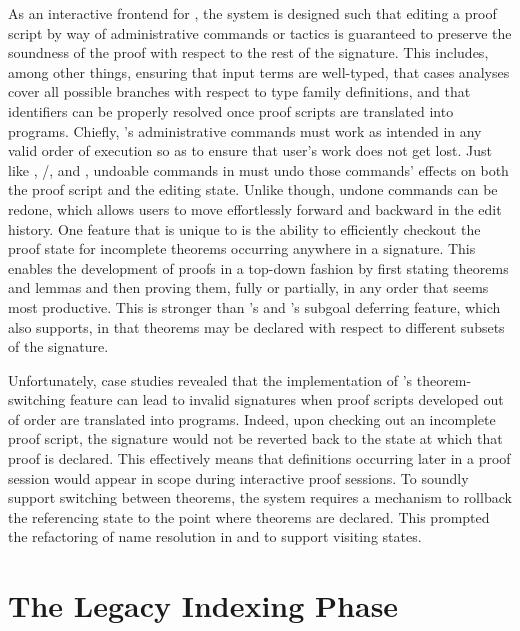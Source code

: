 As an interactive frontend for \Beluga, the \Harpoon system is designed such that editing a proof script by way of administrative commands or tactics is guaranteed to preserve the soundness of the proof with respect to the rest of the \Beluga signature.
This includes, among other things, ensuring that input terms are well-typed, that cases analyses cover all possible branches with respect to type family definitions, and that identifiers can be properly resolved once proof scripts are translated into programs.
Chiefly, \Harpoon's administrative commands must work as intended in any valid order of execution so as to ensure that user's work does not get lost.
Just like \Abella, \Isabelle/\Isar, \Coq and \Agda, undoable commands in \Harpoon must undo those commands' effects on both the proof script and the editing state.
Unlike \Abella though, undone commands can be redone, which allows users to move effortlessly forward and backward in the edit history.
One feature that is unique to \Harpoon is the ability to efficiently checkout the proof state for incomplete theorems occurring anywhere in a \Beluga signature.
This enables the development of proofs in a top-down fashion by first stating theorems and lemmas and then proving them, fully or partially, in any order that seems most productive.
This is stronger than \Abella's and \Coq's subgoal deferring feature, which \Harpoon also supports, in that theorems may be declared with respect to different subsets of the signature.

Unfortunately, case studies revealed that the implementation of \Harpoon's theorem-switching feature can lead to invalid \Beluga signatures when proof scripts developed out of order are translated into programs.
Indeed, upon checking out an incomplete proof script, the signature would not be reverted back to the state at which that proof is declared.
This effectively means that definitions occurring later in a proof session would appear in scope during interactive proof sessions.
To soundly support switching between theorems, the \Beluga system requires a mechanism to rollback the referencing state to the point where theorems are declared.
This prompted the refactoring of name resolution in \Beluga and \Harpoon to support visiting states.

\section{The Legacy Indexing Phase}



